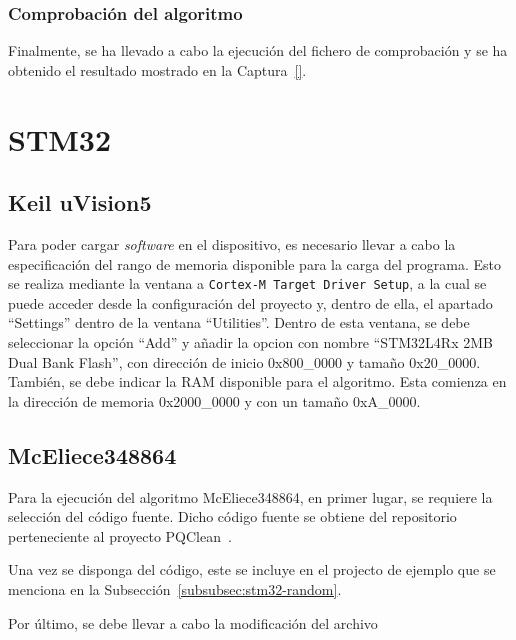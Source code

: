 \subsubsection{Comprobación del algoritmo}\label{subsubsec:sphincs-comp}

Finalmente, se ha llevado a cabo la ejecución del fichero de comprobación y se ha obtenido el resultado mostrado en la Captura~\ref{}.



\section{STM32}\label{sec:stm32}



\subsection{Keil uVision5}\label{subsec:keil}


Para poder cargar \textit{software} en el dispositivo, es necesario llevar a cabo la especificación del rango de memoria disponible para la carga del programa.
Esto se realiza mediante la ventana a \texttt{Cortex-M Target Driver Setup}, a la cual se puede acceder desde la configuración del proyecto y, dentro de ella, el apartado ``Settings'' dentro de la ventana ``Utilities''.
Dentro de esta ventana, se debe seleccionar la opción ``Add'' y añadir la opcion con nombre ``STM32L4Rx 2MB Dual Bank Flash'', con dirección de inicio 0x800\_0000 y tamaño 0x20\_0000.
También, se debe indicar la RAM disponible para el algoritmo.
Esta comienza en la dirección de memoria 0x2000\_0000 y con un tamaño 0xA\_0000.

\subsection{McEliece348864}\label{subsec:mceliece-stm}

Para la ejecución del algoritmo McEliece348864, en primer lugar, se requiere la selección del código fuente.
Dicho código fuente se obtiene del repositorio perteneciente al proyecto PQClean~\cite{pqclean-github}.

Una vez se disponga del código, este se incluye en el projecto de ejemplo que se menciona en la Subsección~\ref{subsubsec:stm32-random}.

Por último, se debe llevar a cabo la modificación del archivo 


